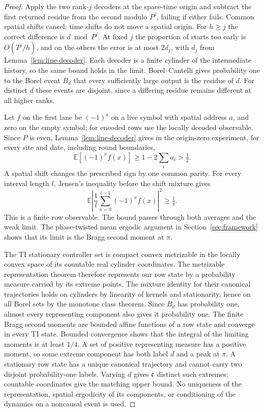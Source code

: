 \begin{proof}
Apply the two rank-$j$ decoders at the space-time origin and subtract
the first returned residue from the second modulo $P^j$, failing if
either fails. Common spatial shifts cancel; time shifts do not move
a spatial origin. For $h\ge j$ the correct difference is $d\bmod P^j$.
At fixed $j$ the proportion of starts too early is $O(T^j/h)$, and
on the others the error is at most $2d_j$, with $d_j$ from
Lemma~\ref{lem:line-decoder}. Each decoder is a finite
cylinder of the intermediate history, so the same bound holds in
the limit. Borel--Cantelli gives probability one to the Borel event
$B_d$ that every sufficiently large output is the residue of $d$.
For distinct $d$ these events are disjoint, since a differing residue
remains different at all higher ranks.

Let $f$ on the first lane be $(-1)^a$ on a live symbol with spatial
address $a$, and zero on the empty symbol; for encoded rows use the
locally decoded observable. Since $P$ is even,
Lemma~\ref{lem:line-decoder} gives in the origin-zero experiment,
for every site and date, including round boundaries,
\[
 \mathbb E[(-1)^x f(x)]\ge1-2\sum_i a_i>\tfrac12.
\]
A spatial shift changes the prescribed sign by one common parity.
For every interval length $l$, Jensen's inequality before the
shift mixture gives
\[
 \mathbb E\left|\frac1l\sum_{x=0}^{l-1}(-1)^xf(x)\right|^2
 \ge\tfrac14.
\]
This is a finite row observable. The bound passes through both
averages and the weak limit. The phase-twisted mean ergodic argument
in Section~\ref{sec:framework} shows that its limit is the Bragg
second moment at $\pi$.

The TI stationary controller set is compact convex metrizable in
the locally convex space of its countable real cylinder coordinates.
The metrizable representation theorem
\cite[Theorem~4.2, pp.~316--317]{bishop-deleeuw} therefore represents
our row state by a probability measure carried by its extreme points.
The mixture identity for their canonical trajectories holds on
cylinders by linearity of kernels and stationarity, hence on all
Borel sets by the monotone class theorem. Since $B_d$ has probability
one, almost every representing component also gives it probability
one. The finite Bragg second moments are bounded affine functions
of a row state and converge in every TI state. Bounded convergence
shows that the integral of the limiting moments is at least $1/4$.
A set of positive representing measure has a positive moment, so
some extreme component has both label $d$ and a peak at $\pi$.
A stationary row state has a unique canonical trajectory and cannot
carry two disjoint probability-one labels. Varying $d$ gives
$\mathfrak c$ distinct such extremes; countable coordinates give the
matching upper bound. No uniqueness of the representation, spatial
ergodicity of its components, or conditioning of the dynamics on a
noncausal event is used.
\end{proof}
